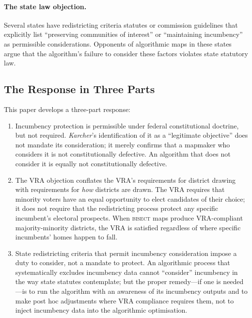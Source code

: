 \paragraph{The state law objection.}
Several states have redistricting criteria statutes or commission guidelines that
explicitly list ``preserving communities of interest'' or ``maintaining incumbency''
as permissible considerations. Opponents of algorithmic maps in these states argue
that the algorithm's failure to consider these factors violates state statutory law.

\subsection{The Response in Three Parts}

This paper develops a three-part response:

\begin{enumerate}
  \item Incumbency protection is permissible under federal constitutional doctrine, but
    not required. \textit{Karcher}'s identification of it as a ``legitimate objective''
    does not mandate its consideration; it merely confirms that a mapmaker who considers
    it is not constitutionally defective. An algorithm that does not consider it is
    equally not constitutionally defective.
  \item The VRA objection conflates the VRA's requirements for district drawing with
    requirements for \textit{how} districts are drawn. The VRA requires that minority
    voters have an equal opportunity to elect candidates of their choice; it does not
    require that the redistricting process protect any specific incumbent's electoral
    prospects. When \textsc{bisect} maps produce VRA-compliant majority-minority
    districts, the VRA is satisfied regardless of where specific incumbents' homes happen
    to fall.
  \item State redistricting criteria that permit incumbency consideration impose a duty
    to consider, not a mandate to protect. An algorithmic process that systematically
    excludes incumbency data cannot ``consider'' incumbency in the way state statutes
    contemplate; but the proper remedy---if one is needed---is to run the algorithm
    with an awareness of its incumbency outputs and to make post hoc adjustments where
    VRA compliance requires them, not to inject incumbency data into the algorithmic
    optimisation.
\end{enumerate}

